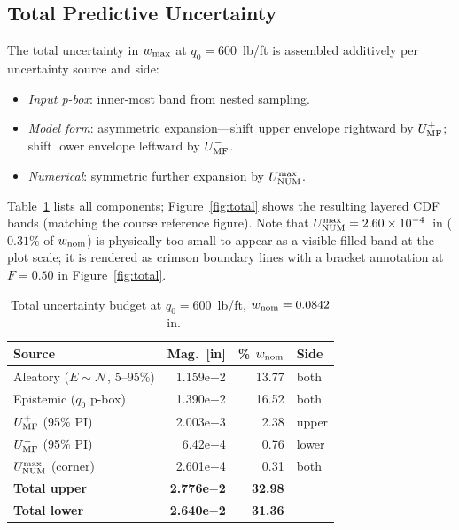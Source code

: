 \documentclass[10pt,twocolumn]{article}
\begin{document}
\subsection{Total Predictive Uncertainty}
\label{sec:total}

The total uncertainty in $w_{\rm max}$ at $q_0=600$~lb/ft is
assembled additively per uncertainty source and side:
\begin{itemize}[leftmargin=*, itemsep=0pt]
  \item \textit{Input p-box}: inner-most band from nested sampling.
  \item \textit{Model form}: asymmetric expansion—shift upper envelope
    rightward by $U_{\rm MF}^+$; shift lower envelope leftward by $U_{\rm MF}^-$.
  \item \textit{Numerical}: symmetric further expansion by $U_{\rm NUM}^{\rm max}$.
\end{itemize}
Table~\ref{tab:budget} lists all components; Figure~\ref{fig:total}
shows the resulting layered CDF bands (matching the course reference figure).
Note that $U_{\rm NUM}^{\rm max}=2.60\times10^{-4}$~in ($0.31\%$ of $w_{\rm nom}$)
is physically too small to appear as a visible filled band at the plot scale; it is
rendered as crimson boundary lines with a bracket annotation at $F=0.50$ in
Figure~\ref{fig:total}.

\begin{table}[ht]
\centering
\caption{Total uncertainty budget at $q_0=600$~lb/ft,
  $w_{\rm nom}=0.0842$~in.}
\label{tab:budget}
\footnotesize
\setlength{\tabcolsep}{3pt}
\begin{tabular}{@{}p{2.8cm}rrp{0.9cm}@{}}
\toprule
Source & Mag.~[in] & \% $w_{\rm nom}$ & Side\\
\midrule
Aleatory ($E{\sim}\mathcal{N}$, 5--95\%) & 1.159e$-$2 & 13.77 & both\\
Epistemic ($q_0$ p-box) & 1.390e$-$2 & 16.52 & both\\
$U_{\rm MF}^+$ (95\% PI) & 2.003e$-$3 &  2.38 & upper\\
$U_{\rm MF}^-$ (95\% PI) & 6.42e$-$4  &  0.76 & lower\\
$U_{\rm NUM}^{\rm max}$ (corner) & 2.601e$-$4 &  0.31 & both\\
\midrule
\textbf{Total upper} & \textbf{2.776e$-$2} & \textbf{32.98} &\\
\textbf{Total lower} & \textbf{2.640e$-$2} & \textbf{31.36} &\\
\bottomrule
\end{tabular}
\end{table}
\end{document}
